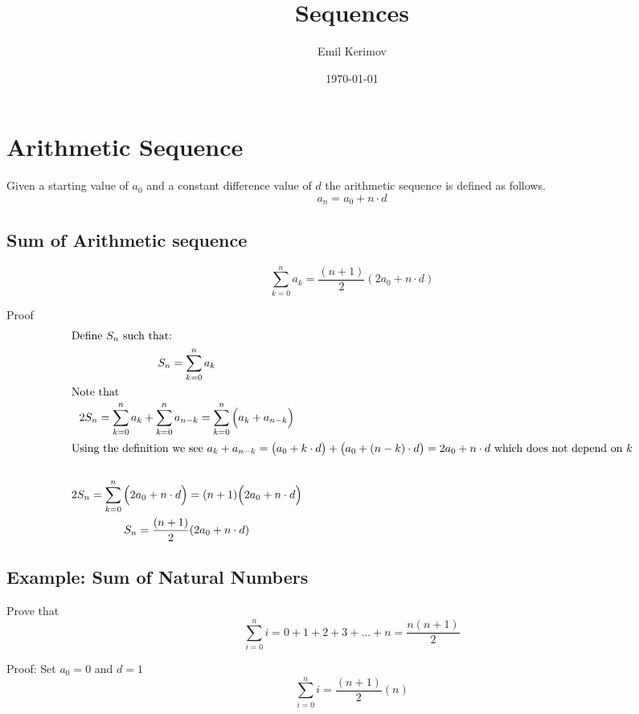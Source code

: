 ﻿\documentclass[a4paper]{article}
\title{Sequences}
\author{Emil Kerimov}
\date{\today}
\begin{document}
\maketitle


\section{Arithmetic Sequence}\label{sas:sec:arithmetic-sequence}

\begin{definition}\label{sas:Arithmetic def}
Given a starting value of $a_0$ and a constant difference value of $d$ the arithmetic sequence is defined as follows.
\[\boxed{
a_n = a_0 + n \cdot d
}
\]
\end{definition}

\subsection{Sum of Arithmetic sequence}\label{sas:subsec:sum-of-arithmetic-sequence}


\begin{theorem}
\begin{equation} \label{sas:eq:sum-of-arithmetic-sequence}
\sum\limits_{k=0}^{n} a_k = \frac{(n+1)}{2} ( 2 a_0 +n \cdot d )
\end{equation}

Proof
\begin{gather*}
\intertext{Define $S_n$ such that:}
S_{n} = \sum_{k=0}^{n} a_k 
\\
\intertext{Note that}
2 S_{n} = \sum_{k=0}^{n} a_k + \sum_{k=0}^{n} a_{n-k} = \sum_{k=0}^{n} \Big( a_k + a_{n-k} \Big)
\\
\intertext{Using the definition we see $a_k + a_{n-k} = \big( a_0 + k \cdot d \big) + \big( a_0 + (n-k) \cdot d \big) =  2 a_0 +n \cdot d $ which does not depend on $k$}
\\
2 S_{n} = \sum_{k=0}^{n} \Big( 2 a_0 +n \cdot d \Big) = (n+1) \Big( 2 a_0 +n \cdot d \Big)
\\
S_{n} = \frac{(n+1)}{2} ( 2 a_0 +n \cdot d )
\end{gather*}
\end{theorem}

\subsection{Example: Sum of Natural Numbers}\label{sas:Sum of Natural Numbers}
Prove that $$\sum\limits_{i=0}^{n} i = 0+ 1+2+3+...+n = \frac{n(n+1)}{2}$$

Proof:
Set $a_0 = 0$ and $d=1$
$$\sum\limits_{i=0}^{n} i
=
\frac{(n+1)}{2} (n )$$
\end{document}
